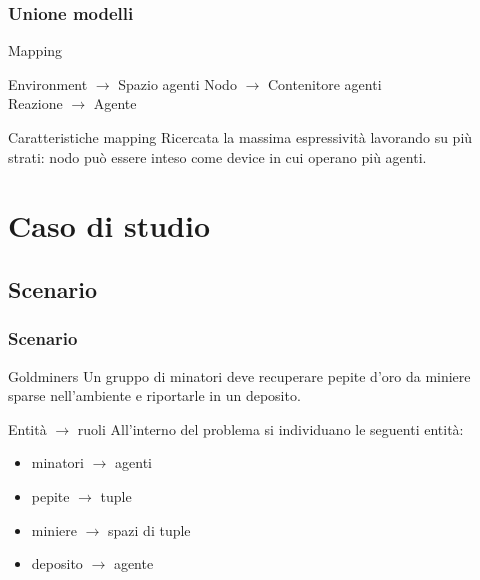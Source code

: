 \documentclass[handout]{beamer}\mode<presentation>{\usetheme{AMSCesenaBleu}}
\begin{document}
\begin{frame}
\frametitle{Unione modelli}
\begin{block}{Mapping}
\begin{center}
\alert{Environment} $\rightarrow$ Spazio agenti \hspace{1.5cm} \alert{Nodo} $\rightarrow$ Contenitore agenti
\\\vspace{0.4cm}
\alert{Reazione} $\rightarrow$ Agente
\end{center}
\end{block}

\begin{block}{Caratteristiche mapping}
Ricercata la massima espressività lavorando su più strati: nodo può essere inteso come device in cui operano più agenti.
\end{block}
\end{frame}



\section{Caso di studio}
\subsection{Scenario}
\begin{frame}
\frametitle{Scenario}
\begin{block}{Goldminers}
Un gruppo di minatori deve recuperare pepite d'oro da miniere sparse nell'ambiente e riportarle in un deposito.
\end{block}
\begin{block}{Entità $\rightarrow$ ruoli}
All'interno del problema si individuano le seguenti entità:
\begin{itemize}
\item \alert{minatori} $\rightarrow$ \alert{agenti}
\item pepite $\rightarrow$ tuple
\item \alert{miniere} $\rightarrow$ \alert{spazi di tuple}
\item deposito $\rightarrow$ agente
\end{itemize}
\end{block}
\end{frame}
\end{document}
